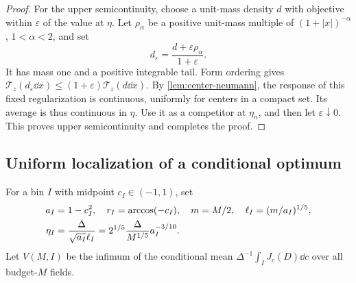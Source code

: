 \begin{proof}
For the upper semicontinuity, choose a unit-mass density $d$ with
objective within $\varepsilon$ of the value at $\eta$. Let
$\rho_\alpha$ be a positive unit-mass multiple of
$(1+|x|)^{-\alpha}$, $1<\alpha<2$, and set
\begin{equation}\label{eq:center-regularization}
       d_\varepsilon=\frac{d+\varepsilon\rho_\alpha}{1+\varepsilon}.
\end{equation}
It has mass one and a positive integrable tail. Form ordering
gives $\mathscr T_z(d_\varepsilon\dd x)\le
(1+\varepsilon)\mathscr T_z(d\dd x)$.
By \cref{lem:center-neumann}, the response of this fixed
regularization is continuous, uniformly for centers in a compact
set. Its average is thus continuous in $\eta$. Use it as a
competitor at $\eta_n$, and then let $\varepsilon\downarrow0$.
This proves upper semicontinuity and completes the proof.
\end{proof}

\subsection{Uniform localization of a conditional optimum}
For a bin $I$ with midpoint $c_I\in(-1,1)$, set
\begin{align}
 a_I&=1-c_I^2,\quad r_I=\arccos(-c_I),\quad m=M/2,
                \quad\ell_I=(m/a_I)^{1/5},\notag\\
 \eta_I&=\frac{\Delta}{\sqrt{a_I}\ell_I}
          =2^{1/5}\frac{\Delta}{M^{1/5}}a_I^{-3/10}.
                         \label{eq:bin-local-scales}
\end{align}
Let $V(M,I)$ be the infimum of the conditional mean
$\Delta^{-1}\int_IJ_c(D)\dd c$ over all budget-$M$ fields.

